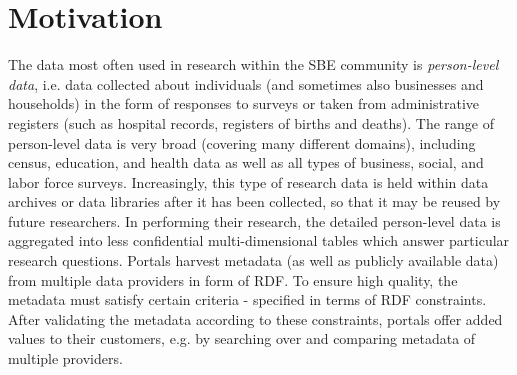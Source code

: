 \documentclass{llncs}
\begin{document}
\section{Motivation}

The data most often used in research within the SBE community is \emph{person-level data}, i.e. data collected about individuals 
(and sometimes also businesses and households) in the form of responses to surveys or taken from administrative registers
(such as hospital records, registers of births and deaths). 
The range of person-level data is very broad (covering many different domains), 
including census, education, and health data as well as all types of business, social, and labor force surveys.  
Increasingly, this type of research data is
held within data archives or data libraries after it has been collected, so that it may be
reused by future researchers. 
In performing their research, the detailed person-level
data is aggregated into less confidential multi-dimensional tables which answer particular research questions.
Portals harvest metadata (as well as publicly available data) from multiple data providers in form of RDF.
To ensure high quality, the metadata must satisfy certain criteria - specified in terms of RDF constraints.  
After validating the metadata according to these constraints, portals offer added values to their customers, e.g. by searching over and comparing metadata of multiple providers. 
\end{document}
